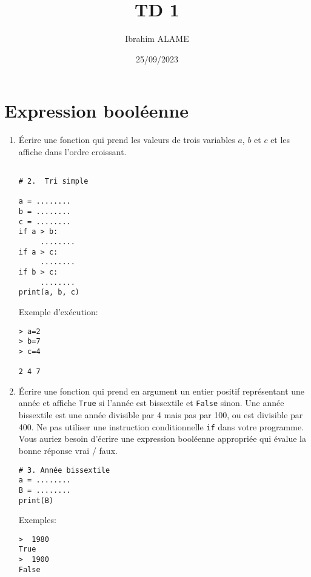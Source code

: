 \documentclass[a4paper]{article}
\title{TD 1}
\author{Ibrahim ALAME}
\date{25/09/2023}
\begin{document}
\maketitle



\section{Expression booléenne}
\begin{enumerate}
\item Écrire une fonction qui prend les valeurs de trois variables $a$, $b$ et $c$ et les affiche dans l'ordre croissant.
\begin{lstlisting}

# 2.  Tri simple

a = ........
b = ........
c = ........
if a > b:
     ........
if a > c:
     ........
if b > c:
     ........
print(a, b, c)

\end{lstlisting}

Exemple d'exécution:

\begin{verbatim}
> a=2
> b=7
> c=4

2 4 7
\end{verbatim}

\item Écrire une fonction qui prend en argument un entier positif représentant une année et affiche {\tt True} si l'année est bissextile et {\tt False} sinon. Une année bissextile est une année divisible par 4 mais pas par 100, ou est divisible par 400. Ne pas utiliser une instruction conditionnelle {\tt if} dans votre programme. Vous auriez besoin d'écrire une expression booléenne appropriée qui évalue la bonne réponse vrai / faux.
\begin{lstlisting}
# 3. Année bissextile
a = ........
B = ........
print(B)
\end{lstlisting}
Exemples:
\begin{verbatim}
>  1980
True
>  1900
False
\end{verbatim}
\end{enumerate}
\end{document}

